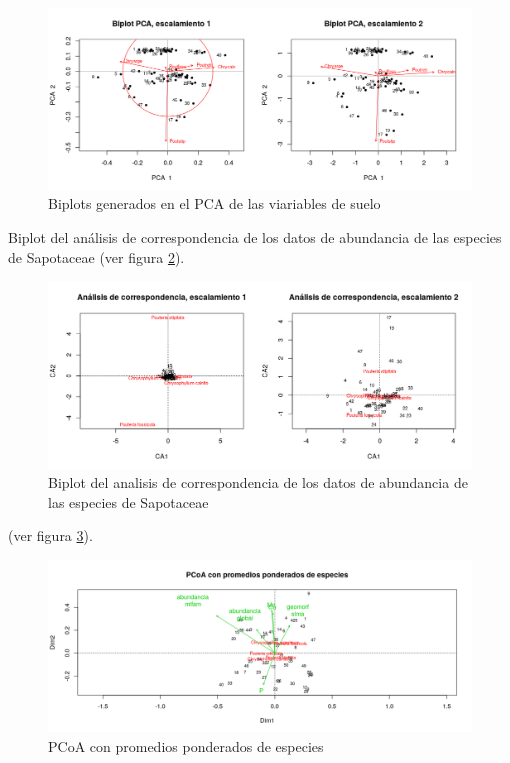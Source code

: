 \documentclass[11pt,]{article}
\begin{document}
\begin{figure}
\centering
\includegraphics[width=1.00000\textwidth]{PCA_comunidad_actualizado.png}
\caption{Biplots generados en el PCA de las viariables de suelo
\label{fig:PCA_comunidad}}
\end{figure}

Biplot del análisis de correspondencia de los datos de abundancia de las
especies de Sapotaceae (ver figura
\ref{fig:Analisis_de_correspondencia}).

\begin{figure}
\centering
\includegraphics[width=1.00000\textwidth]{analisis_de_correspondencia_actualizado.png}
\caption{Biplot del analisis de correspondencia de los datos de
abundancia de las especies de Sapotaceae
\label{fig:Analisis_de_correspondencia}}
\end{figure}

(ver figura \ref{fig:PCoA _promedios_especies}).

\begin{figure}
\centering
\includegraphics[width=1.00000\textwidth]{Promedios_ponderados.png}
\caption{PCoA con promedios ponderados de especies
\label{fig:PCoA _promedios_especies}}
\end{figure}
\end{document}
